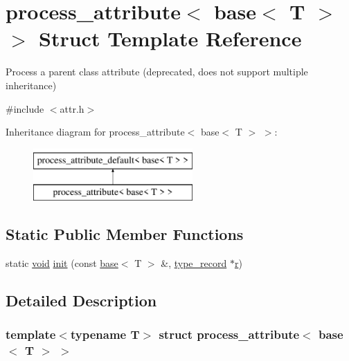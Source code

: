 \hypertarget{structprocess__attribute_3_01base_3_01_t_01_4_01_4}{}\section{process\+\_\+attribute$<$ base$<$ T $>$ $>$ Struct Template Reference}
\label{structprocess__attribute_3_01base_3_01_t_01_4_01_4}


Process a parent class attribute (deprecated, does not support multiple inheritance)  




{\ttfamily \#include $<$attr.\+h$>$}

Inheritance diagram for process\+\_\+attribute$<$ base$<$ T $>$ $>$\+:\begin{figure}[H]
\begin{center}
\leavevmode
\includegraphics[height=2.000000cm]{structprocess__attribute_3_01base_3_01_t_01_4_01_4}
\end{center}
\end{figure}
\subsection*{Static Public Member Functions}
\begin{DoxyCompactItemize}
\item 
static \mbox{\hyperlink{_s_d_l__opengles2__gl2ext_8h_ae5d8fa23ad07c48bb609509eae494c95}{void}} \mbox{\hyperlink{structprocess__attribute_3_01base_3_01_t_01_4_01_4_ae448bc67fd8ae68058eafcf6c9476598}{init}} (const \mbox{\hyperlink{structbase}{base}}$<$ T $>$ \&, \mbox{\hyperlink{structtype__record}{type\+\_\+record}} $\ast$\mbox{\hyperlink{_s_d_l__opengl_8h_a42ce7cdc612e53abee15043f80220d97}{r}})
\end{DoxyCompactItemize}


\subsection{Detailed Description}
\subsubsection*{template$<$typename T$>$\newline
struct process\+\_\+attribute$<$ base$<$ T $>$ $>$}

